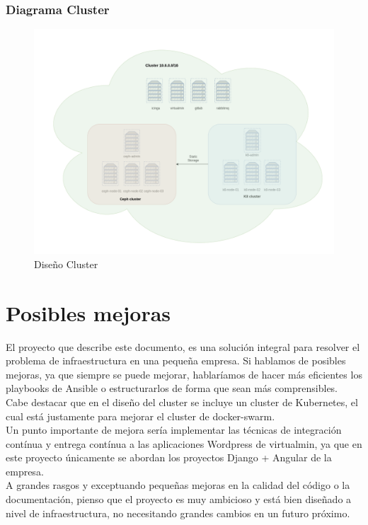 \begin{paragraph}
		\subsubsection{Diagrama Cluster}
			\begin{figure}[!hbt]
				\centering
				\includegraphics[scale=0.33]{imagenes/Diseno/diagrama_cluster.png}
				\caption[Diseño Cluster]{Diseño Cluster} 
				\label{cluster_design}
			\end{figure}
		
	\end{paragraph}
		
\section{Posibles mejoras}
	\begin{paragraph}
		El proyecto que describe este documento, es una solución integral para resolver el problema de infraestructura en una pequeña empresa. Si hablamos de posibles mejoras, ya que siempre se puede mejorar, hablaríamos de hacer más eficientes los playbooks de Ansible o estructurarlos de forma que sean más comprensibles. Cabe destacar que en el diseño del cluster se incluye un cluster de Kubernetes, el cual está justamente para mejorar el cluster de docker-swarm. \\
		Un punto importante de mejora sería implementar las técnicas de integración contínua y entrega contínua a las aplicaciones Wordpress de virtualmin, ya que en este proyecto únicamente se abordan los proyectos Django + Angular de la empresa. \\
		A grandes rasgos y exceptuando pequeñas mejoras en la calidad del código o la documentación, pienso que el proyecto es muy ambicioso y está bien diseñado a nivel de infraestructura, no necesitando grandes cambios en un futuro próximo.
	\end{paragraph}